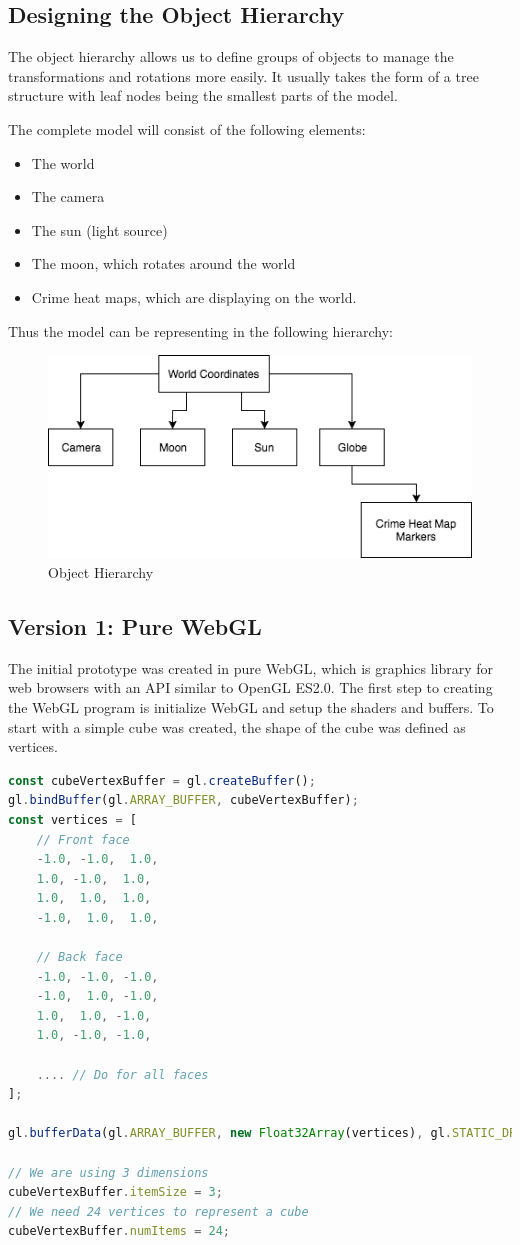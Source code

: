 \documentclass[]{article}
\begin{document}
\subsection{Designing the Object Hierarchy}

The object hierarchy allows us to define groups of objects to manage the transformations and rotations more easily.
It usually takes the form of a tree structure with leaf nodes being the smallest parts of the model.

The complete model will consist of the following elements:

\begin{itemize}
	\item The world
	\item The camera
	\item The sun (light source)
	\item The moon, which rotates around the world
	\item Crime heat maps, which are displaying on the world.
\end{itemize}

Thus the model can be representing in the following hierarchy:

\begin{figure}[H]
   \centering
   \includegraphics[width=0.5\linewidth]{images/object_hierachy}
   \caption{Object Hierarchy}
   \label{fig:object_hierarchy}
\end{figure}

\subsection{Version 1: Pure WebGL}

The initial prototype was created in pure WebGL, which is graphics library for web browsers with an API similar to OpenGL ES2.0.
The first step to creating the WebGL program is initialize WebGL and setup the shaders and buffers.
To start with a simple cube was created, the shape of the cube was defined as vertices.

\begin{lstlisting}[language=JavaScript]
const cubeVertexBuffer = gl.createBuffer();
gl.bindBuffer(gl.ARRAY_BUFFER, cubeVertexBuffer);
const vertices = [
    // Front face
    -1.0, -1.0,  1.0,
    1.0, -1.0,  1.0,
    1.0,  1.0,  1.0,
    -1.0,  1.0,  1.0,

    // Back face
    -1.0, -1.0, -1.0,
    -1.0,  1.0, -1.0,
    1.0,  1.0, -1.0,
    1.0, -1.0, -1.0,

    .... // Do for all faces
];

gl.bufferData(gl.ARRAY_BUFFER, new Float32Array(vertices), gl.STATIC_DRAW);

// We are using 3 dimensions
cubeVertexBuffer.itemSize = 3;
// We need 24 vertices to represent a cube
cubeVertexBuffer.numItems = 24;
\end{lstlisting}
\end{document}
